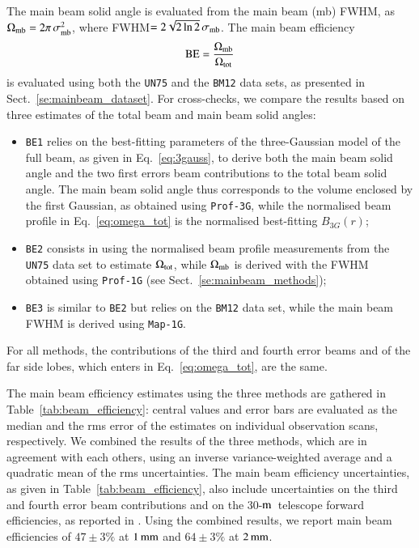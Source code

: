 \documentclass[traditionalabstract]{aa}
\newcommand{\trentemetre}{30-$\rm{m}$}
\newcommand{\rev}[1]{#1}
\begin{document}
{\rev The main beam solid angle is evaluated from the main beam (mb) FWHM, as
$\Omega_{\rm{mb}} = 2 \pi\,  \sigma_{\rm{mb}}^2$, where
FWHM$ =2\sqrt{2\ln{2}}\, \sigma_{\rm{mb}}$. The main beam efficiency
\begin{equation}
\rm{BE} = \frac{\Omega_{\rm{mb}}}{\Omega_{\rm{tot}}}
\end{equation}
is evaluated using both the {\tt UN75} and the {\tt BM12} data sets,
as presented in Sect.~\ref{se:mainbeam_dataset}.} For cross-checks, we
compare the results based on three estimates of the total beam and
main beam solid angles:
\begin{itemize}
  \item{{\tt BE1} relies on the best-fitting parameters of the
    three-Gaussian model of the full beam, as given in
    Eq.~\ref{eq:3gauss}, to derive both the main beam solid angle and
    the two first errors beam contributions to the total beam solid
    angle. The main beam solid angle thus corresponds to the volume
    enclosed by the first Gaussian, as obtained using {\tt Prof-3G},
    while the normalised beam profile in Eq.~\ref{eq:omega_tot} is the
    normalised best-fitting $B_{3G}(r)$;}
  \item{{\tt BE2} consists in using the normalised beam profile
    measurements from the {\tt UN75} data set to estimate
    $\Omega_{\rm{tot}}$, while $\Omega_{\rm{mb}}$ is
    derived with the FWHM obtained using {\tt Prof-1G} (see
    Sect.~\ref{se:mainbeam_methods});}
  \item{{\tt BE3} is similar to {\tt BE2} but relies on the {\tt BM12}
    data set, while the main beam FWHM is derived using {\tt Map-1G}.}  
\end{itemize}
For all methods, the contributions of the third and fourth error beams
and of the far side lobes, which enters in Eq.~\ref{eq:omega_tot}, are
the same. 



The main beam efficiency estimates using the three methods are gathered
in Table~\ref{tab:beam_efficiency}: central values and error
bars are evaluated as the median and the rms error of the
estimates on individual observation scans, respectively. 
{\rev We combined the results of the three methods, which are in
agreement with each others, using an inverse variance-weighted
average and a quadratic mean of the rms uncertainties. 
The main beam efficiency uncertainties, as given in
Table~\ref{tab:beam_efficiency}, also include uncertainties on the
third and fourth error beam contributions and on the \trentemetre\
telescope forward efficiencies, as reported
in \citet{Greve1998, Kramer2013}.}
Using the combined results, we report main beam efficiencies of
{\rev $47 \pm 3 \%$ at $1\,\rm{mm}$ and  $64 \pm 3 \%$ at $2\,\rm{mm}$.}
\end{document}
